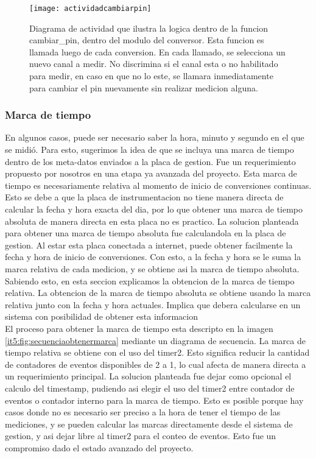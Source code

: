 \begin{figure}[h]
  \centering
  \texttt{[image: actividadcambiarpin]}
  \caption[Diagrama de actividad de la funcion cambiar pin]{Diagrama de actividad que ilustra la logica dentro de la funcion cambiar\_pin, dentro del modulo del conversor. Esta funcion es llamada luego de cada conversion. En cada llamado, se selecciona un nuevo canal a medir. No discrimina si el canal esta o no habilitado para medir, en caso en que no lo este, se llamara inmediatamente para cambiar el pin nuevamente sin realizar medicion alguna.}\label{it5:fig:actividadcambiarpin}
\end{figure}

\subsubsection{Marca de tiempo} %
\label{ssub:marca_de_tiempo}

En algunos casos, puede ser necesario saber la hora, minuto y segundo en el que se midió. Para esto, sugerimos la idea de que se incluya una marca de tiempo dentro de los meta-datos enviados a la placa de gestion. Fue un requerimiento propuesto por nosotros en una etapa ya avanzada del proyecto. Esta marca de tiempo es necesariamente relativa al momento de inicio de conversiones continuas. Esto se debe a que la placa de instrumentacion no tiene manera directa de calcular la fecha y hora exacta del dia, por lo que obtener una marca de tiempo absoluta de manera directa en esta placa no es practico. 
La solucion planteada para obtener una marca de tiempo absoluta fue calculandola en la placa de gestion. Al estar esta placa conectada a internet, puede obtener facilmente la fecha y hora de inicio de conversiones. Con esto, a la fecha y hora se le suma la marca relativa de cada medicion, y se obtiene asi la marca de tiempo absoluta. Sabiendo esto, en esta seccion explicamos la obtencion de la marca de tiempo relativa. La obtencion de la marca de tiempo absoluta se obtiene usando la marca relativa junto con la fecha y hora actuales. Implica que debera calcularse en un sistema con posibilidad de obtener esta informacion \\

El proceso para obtener la marca de tiempo esta descripto en la imagen \ref{it5:fig:secuenciaobtenermarca} mediante un diagrama de secuencia. La marca de tiempo relativa se obtiene con el uso del timer2. Esto significa reducir la cantidad de contadores de eventos disponibles de 2 a 1, lo cual afecta de manera directa a un requerimiento principal. La solucion planteada fue dejar como opcional el calculo del timestamp, pudiendo asi elegir el uso del timer2 entre contador de eventos o contador interno para la marca de tiempo. Esto es posible porque hay casos donde no es necesario ser preciso a la hora de tener el tiempo de las mediciones, y se pueden calcular las marcas directamente desde el sistema de gestion, y asi dejar libre al timer2 para el conteo de eventos. Esto fue un compromiso dado el estado avanzado del proyecto.


